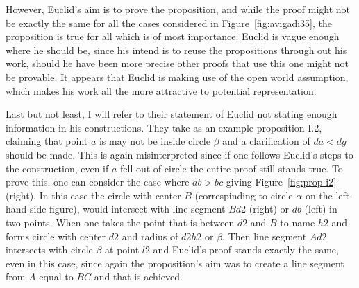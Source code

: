 \documentclass[]{interact}
\theoremstyle{plain}
\theoremstyle{definition}
\theoremstyle{remark}
\begin{document}
However, Euclid's aim is to prove the proposition, and while the proof
might not be exactly the same for all the cases considered in
Figure~\ref{fig:avigadi35}, the proposition is true for all which is
of most importance. Euclid is vague enough where he should be, since
his intend is to reuse the propositions through out his work, should
he have been more precise other proofs that use this one might not be
provable. It appears that Euclid is making use of the open world
assumption, which makes his work all the more attractive to potential
representation.

Last but not least, I will refer to their statement of Euclid not
stating enough information in his constructions. They take as an
example proposition I.2, claiming that point $a$ is may not be inside
circle $\beta$ and a clarification of $da<dg$ should be made. This is
again misinterpreted since if one follows Euclid's steps to the
construction, even if $a$ fell out of circle the entire proof still
stands true. To prove this, one can consider the case where $ab>bc$
giving Figure~\ref{fig:prop-i2} (right). In this case the
circle with center $B$ (correspinding to circle $\alpha$ on the
left-hand side figure), would intersect with line
segment $Bd2$ (right) or $db$ (left) in two points.
When one takes the point that is between $d2$ and $B$ to name $h2$ and
forms circle with center $d2$ and radius of $d2h2$ or $\beta$. Then
line segment $Ad2$ intersects with circle $\beta$ at point $l2$ and
Euclid's proof stands exactly the same, even in this case, since again
the proposition's aim was to create a line segment from $A$ equal to
$BC$ and that is achieved.
\end{document}
